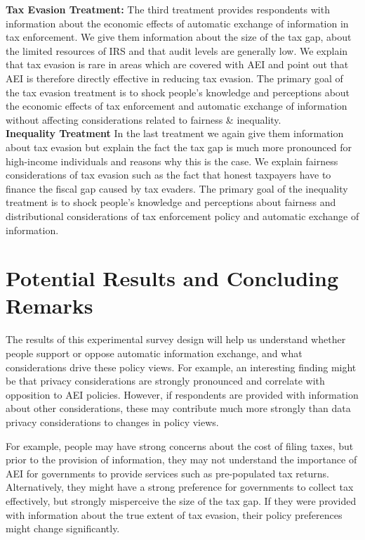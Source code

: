 \documentclass[11pt]{article}
\begin{document}
\textbf{Tax Evasion Treatment:}
The third treatment provides respondents with information about the economic effects of automatic exchange of information in tax enforcement. We give them information about the size of the tax gap, about the limited resources of IRS and that audit levels are generally low. We explain that tax evasion is rare in areas which are covered with AEI and point out that AEI is therefore directly effective in reducing tax evasion. The primary goal of the tax evasion treatment is to shock people’s knowledge and perceptions about the economic effects of tax enforcement and automatic exchange of information without affecting considerations related to fairness \& inequality. \\[0.5em]%
\textbf{Inequality Treatment}
In the last treatment we again give them information about tax evasion but explain the fact the tax gap is much more pronounced for high-income individuals and reasons why this is the case. We explain fairness considerations of tax evasion such as the fact that honest taxpayers have to finance the fiscal gap caused by tax evaders. The primary goal of the inequality treatment is to shock people’s knowledge and perceptions about fairness and distributional considerations of tax enforcement policy and automatic exchange of information. 
\section{Potential Results and Concluding Remarks}
The results of this experimental survey design will help us understand whether people support or oppose automatic information exchange, and what considerations drive these policy views. For example, an interesting finding might be that privacy considerations are strongly pronounced and correlate with opposition to AEI policies. However, if respondents are provided with information about other considerations, these may contribute much more strongly than data privacy considerations to changes in policy views. 

For example, people may have strong concerns about the cost of filing taxes, but prior to the provision of information, they may not understand the importance of AEI for governments to provide services such as pre-populated tax returns. Alternatively, they might have a strong preference for governments to collect tax effectively, but strongly misperceive the size of the tax gap. If they were provided with information about the true extent of tax evasion, their policy preferences might change significantly. 
\end{document}
